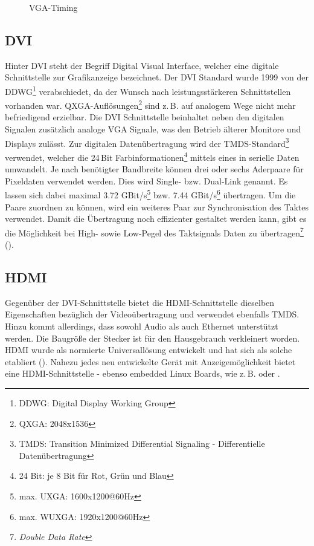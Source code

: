 \begin{figure}[htp]
	\centering
{}
	\caption{VGA-Timing}
	\label{fig:vga_timing}
\end{figure}

\subsection{DVI}
Hinter DVI steht der Begriff Digital Visual Interface, welcher eine digitale Schnittstelle zur Grafikanzeige bezeichnet. Der DVI Standard wurde 1999 von der DDWG\footnote{DDWG: Digital Display Working Group} verabschiedet, da der Wunsch nach leistungsstärkeren Schnittstellen vorhanden war. QXGA-Auflösungen\footnote{QXGA: 2048x1536} sind z.\,B. auf analogem Wege nicht mehr befriedigend erzielbar. Die DVI Schnittstelle beinhaltet neben den digitalen Signalen zusätzlich analoge VGA Signale, was den Betrieb älterer Monitore und Displays zulässt. Zur digitalen Datenübertragung wird der TMDS-Standard\footnote{TMDS: Transition Minimized Differential Signaling - Differentielle Datenübertragung} verwendet, welcher die 24\,Bit Farbinformationen\footnote{24 Bit: je 8 Bit für Rot, Grün und Blau} mittels eines  in serielle Daten umwandelt. Je nach benötigter Bandbreite können drei oder sechs Aderpaare für Pixeldaten verwendet werden. Dies wird Single- bzw. Dual-Link genannt. Es lassen sich dabei maximal 3.72 GBit/s\footnote{max. UXGA: 1600x1200@60Hz} bzw. 7.44 GBit/s\footnote{max. WUXGA: 1920x1200@60Hz} übertragen. Um die Paare zuordnen zu können, wird ein weiteres Paar zur Synchronisation des Taktes verwendet. Damit die Übertragung noch effizienter gestaltet werden kann, gibt es die Möglichkeit bei High- sowie Low-Pegel des Taktsignals Daten zu übertragen\footnote{\textit{Double Data Rate}} (\cite{Leunig2002}).

\subsection{HDMI}
Gegenüber der DVI-Schnittstelle bietet die HDMI-Schnittstelle dieselben Eigenschaften bezüglich der Videoübertragung und verwendet ebenfalls TMDS. Hinzu kommt allerdings, dass sowohl Audio als auch Ethernet unterstützt werden. Die Baugröße der Stecker ist für den Hausgebrauch verkleinert worden. HDMI wurde als normierte Universallösung entwickelt und hat sich als solche etabliert (\cite{Extron2014}). Nahezu jedes neu entwickelte Gerät mit Anzeigemöglichkeit bietet eine HDMI-Schnittstelle - ebenso embedded Linux Boards, wie z.\,B.  oder .

